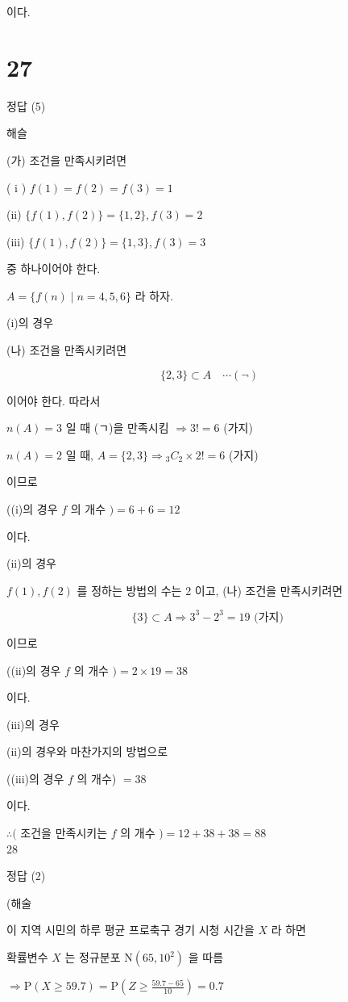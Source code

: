 \documentclass[10pt]{article}
\begin{document}
이다.

\section*{27}
정답 (5)

해슬

(가) 조건을 만족시키려면

( i ) \(f(1)=f(2)=f(3)=1\)

(ii) \(\{f(1), f(2)\}=\{1,2\}, f(3)=2\)

(iii) \(\{f(1), f(2)\}=\{1,3\}, f(3)=3\)

중 하나이어야 한다.

\(A=\{f(n) \mid n=4,5,6\}\) 라 하자.

(i)의 경우

(나) 조건을 만족시키려면

\[
\{2,3\} \subset A \quad \cdots(\neg)
\]

이어야 한다. 따라서

\(n(A)=3\) 일 때 (ㄱ)을 만족시킴 \(\Rightarrow 3!=6\) (가지)

\(n(A)=2\) 일 때, \(A=\{2,3\} \Rightarrow{ }_{3} C_{2} \times 2!=6\) (가지)

이므로

((i)의 경우 \(f\) 의 개수 \()=6+6=12\)

이다.

(ii)의 경우

\(f(1), f(2)\) 를 정하는 방법의 수는 2 이고, (나) 조건을 만족시키려면

\[
\{3\} \subset A \Rightarrow 3^{3}-2^{3}=19 \text { (가지) }
\]

이므로

((ii)의 경우 \(f\) 의 개수 \()=2 \times 19=38\)

이다.

(iii)의 경우

(ii)의 경우와 마찬가지의 방법으로

((iii)의 경우 \(f\) 의 개수) \(=38\)

이다.

\(\therefore(\) 조건을 만족시키는 \(f\) 의 개수 \()=12+38+38=88\)\\
28

정답 (2)

(해술

이 지역 시민의 하루 평균 프로축구 경기 시청 시간을 \(X\) 라 하면

확률변수 \(X\) 는 정규분포 \(\mathrm{N}\left(65,10^{2}\right)\) 을 따름

\(\Rightarrow \mathrm{P}(X \geq 59.7)=\mathrm{P}\left(Z \geq \frac{59.7-65}{10}\right)=0.7\)
\end{document}
